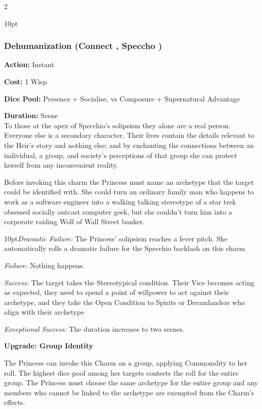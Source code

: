 \begin{multicols}{2}
\begin{myindentpar}{10pt}
\end{myindentpar}

\subsubsection*{Dehumanization (Connect \textbullet\textbullet\textbullet, Speccho \textbullet\textbullet\textbullet\textbullet\textbullet)}

\noindent \textbf{Action:} Instant

\noindent \textbf{Cost:} 1 Wisp

\noindent \textbf{Dice Pool:} Presence + Socialise, vs Composure + Supernatural Advantage

\noindent \textbf{Duration:} Scene \\

\noindent To those at the apex of Specchio's solipsism they alone are a real person. Everyone else is a secondary character. Their lives contain the details relevant to the Heir's story and nothing else; and by enchanting the connections between an individual, a group, and society's perceptions of that group she can protect herself from any inconvenient reality.

Before invoking this charm the Princess must name an archetype that the target could be identified with. She could turn an ordinary family man who happens to work as a software engineer into a walking talking stereotype of a star trek obsessed socially outcast computer geek, but she couldn't turn him into a corporate raiding Wolf of Wall Street banker.

\begin{myindentpar}{10pt}\emph{Dramatic Failure:} The Princess' solipsism reaches a fever pitch. She automatically rolls a dramatic failure for the Specchio backlash on this charm
    
	\emph{Failure:} Nothing happens. 
    
	\emph{Success:} The target takes the Stereotypical condition. Their Vice becomes acting as expected, they need to spend a point of willpower to act against their archetype, and they take the Open Condition to Spirits or Dreamlanders who align with their archetype
    
	\emph{Exceptional Success:} The duration increases to two scenes. 
	
	\textbf{Upgrade: Group Identity}
	
	The Princess can invoke this Charm on a group, applying Commonality to her roll. The highest dice pool among her targets contests the roll for the entire group. The Princess must choose the same archetype for the entire group and any members who cannot be linked to the archetype are exempted from the Charm's effects. 
	

\end{myindentpar}
\end{multicols}
